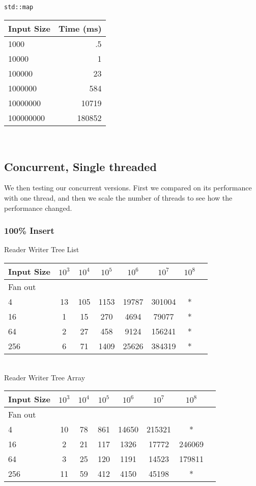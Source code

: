 \documentclass{sig-alternate}
\begin{document}
\texttt{std::map}\\
\begin{tabular}{| l | r |}
  \hline
  Input Size & Time (ms)\\  \hline
  1000			&	.5	\\
  10000			&	1	\\
  100000		&	23	\\
  1000000		&	584	\\
  10000000		&	10719	\\
  100000000		&	180852	\\
  \hline
\end{tabular}\\

\subsection{Concurrent, Single threaded}
We then testing our concurrent versions.
First we compared on its performance with one thread, and then we scale the number of threads to see how the performance changed.

\subsubsection{100\% Insert}
Reader Writer Tree List \\
\begin{tabular}{| l | c | c | c | c | c | c | r}
  \hline
  Input Size & $10^3$ & $10^4$ & $10^5$ & $10^6$ & $10^7$ & $10^8$ \\ \hline
  Fan out & & & & & &  \\  \hline
  4			&	13 & 105 & 1153 & 19787 & 301004 & * \\
  16		&	1 & 15 & 270 & 4694 & 79077 & * \\
  64		&	2 & 27 & 458 & 9124 & 156241 & * \\
  256		&	6 & 71 & 1409 & 25626 & 384319 & * \\
  \hline
\end{tabular} \\

Reader Writer Tree Array \\
\begin{tabular}{| l | c | c | c | c | c | c | r}
  \hline
  Input Size & $10^3$ & $10^4$ & $10^5$ & $10^6$ & $10^7$ & $10^8$ \\ \hline
  Fan out & & & & & &  \\  \hline
  4			&	10 & 78 & 861 & 14650 & 215321 & * \\
  16		&	2 & 21 & 117 & 1326 & 17772 & 246069 \\
  64		&	3 & 25 & 120 & 1191 & 14523 & 179811 \\
  256		&	11 & 59 & 412 & 4150 & 45198 & * \\
  \hline
\end{tabular} 
\end{document}
